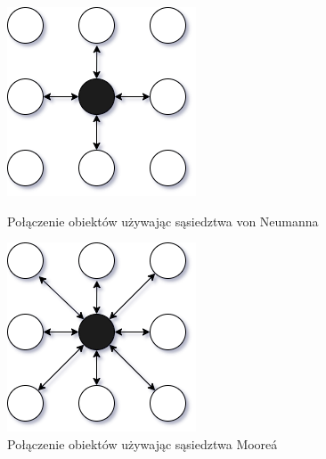 \documentclass[12pt, letterpaper]{report}
\begin{document}
    \begin{figure}
        \includegraphics[width=0.95\linewidth]{four_nebiours.drawio.png} 
        \caption{Połączenie obiektów używając sąsiedztwa von Neumanna}
        \includegraphics[width=0.95\linewidth]{eight_nebiours.drawio.png} 
        \caption{Połączenie obiektów używając sąsiedztwa Moore\'a}
    \end{figure}
\end{document}
